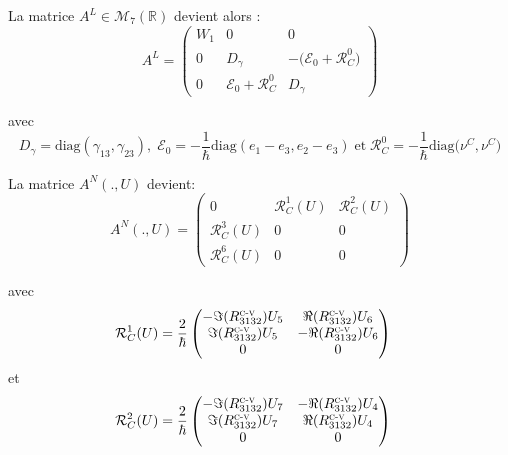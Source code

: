 \documentclass[12pt,a4paper,openany,oneside]{book}
\begin{document}
{{{{{{La matrice $ A^{L}\in \mathcal{M}_{7}(\mathbb{R})$ devient alors :
\begin{equation}\label{AL sans intrabande}
A^{L}=
\begin{pmatrix}
W_{1} &      0                    & 0                       \\
    0 & D_{\gamma}                &  -\big(\mathcal{E}_{0}+ \mathcal{R}^{0}_{C}\big) \\
    0 & \mathcal{E}_{0}+ \mathcal{R}^{0}_{C}  &  D_{\gamma}
\end{pmatrix}
\end{equation}

 avec 
$$ D_{\gamma} = \textrm{diag}(\gamma_{13}, \gamma_{23}), \; \mathcal{E}_{0} =- \dfrac{1}{\hbar}  \textrm{diag}(e_{1}-e_{3}, e_{2}-e_{3}) \; \textrm{et} \;  
\mathcal{R}^{0}_{C} =- \dfrac{1}{\hbar}  \textrm{diag}\big(\nu^{C}, \nu^{C}\big)$$

La matrice $ A^{N}(.,U)$ devient:
\begin{equation}\label{AN sans intrabande}
A^{N}(.,U)=
\begin{pmatrix}
0 & \mathcal{R}^{1}_{C}(U) & \mathcal{R}^{2}_{C}(U)\\
\mathcal{R}^{3}_{C}(U) & 0 & 0                      \\
\mathcal{R}^{6}_{C}(U) & 0 & 0
\end{pmatrix}
\end{equation}

avec 
%
\begin{eqnarray*}
\mathcal{R}^{1}_{C}(U) &= \dfrac{2}{\hbar}
\begin{pmatrix}
 -\Im(R^{\textsc{c-v}}_{3132})U_{5} & \Re(R^{\textsc{c-v}}_{3132})U_{6}\\
\Im(R^{\textsc{c-v}}_{3132})U_{5}   & -\Re(R^{\textsc{c-v}}_{3132})U_{6}\\
                                 0  & 0
\end{pmatrix}
\end{eqnarray*}
et 
\begin{eqnarray*} 
\mathcal{R}^{2}_{C}(U) &= \dfrac{2}{\hbar}
\begin{pmatrix}
 -\Im(R^{\textsc{c-v}}_{3132})U_{7} & -\Re(R^{\textsc{c-v}}_{3132})U_{4}\\
 \Im(R^{\textsc{c-v}}_{3132})U_{7}  & \Re(R^{\textsc{c-v}}_{3132})U_{4}\\
                                  0 & 0
\end{pmatrix}
\end{eqnarray*}
 

}}}}}}
\end{document}
